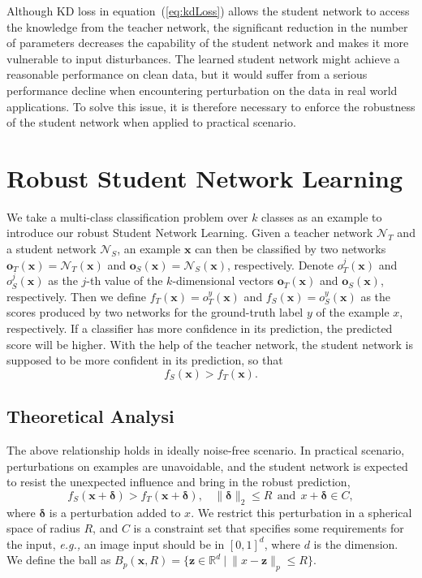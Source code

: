 \documentclass[journal]{IEEEtran}
\newcommand{\Eref}[1]{equation~(\ref{#1})}
\newcommand{\bx}{\bm{x}}
\newcommand{\bo}{\bm{o}}
\newcommand{\bz}{\bm{z}}
\newcommand{\bdelta}{\bm{\delta}}
\begin{document}
Although KD loss in \Eref{eq:kdLoss} allows the student network to access the knowledge from the teacher network, the significant reduction in the number of parameters decreases the capability of the student network and makes it more vulnerable to input disturbances. The learned student network might achieve a reasonable performance on clean data, but it would suffer from a serious performance decline when encountering perturbation on the data in real world applications. To solve this issue, it is therefore necessary to enforce the robustness of the student network when applied to practical scenario.

\section{Robust Student Network Learning} 
We take a multi-class classification problem over $k$ classes as an example to introduce our robust Student Network Learning. Given a teacher network $\mathcal N_T$ and a student network $\mathcal N_S$, an example $\bx$ can then be classified by two networks $\bo_T(\bx) = \mathcal N_T(\bx)$ and $\bo_S(\bx) = \mathcal N_S(\bx)$, respectively. Denote $o_T^j(\bx)$ and  $o_S^j(\bx)$ as the $j$-th value of the $k$-dimensional vectors $\bo_T(\bx)$ and $\bo_S(\bx)$, respectively. Then we define $f_T(\bx) = o_T^y(\bx)$ and $f_S(\bx) = o_S^y(\bx)$ as the scores produced by two networks for the ground-truth label $y$ of the example $x$, respectively. If a classifier has more confidence in its prediction, the predicted score will be higher. With the help of the teacher network, the student network is supposed to be more confident in its prediction, so that
\begin{equation}
f_S(\bx)>f_T(\bx).
\label{eq:constrain1}
\end{equation}

\subsection{Theoretical Analysi}
The above relationship holds in ideally noise-free scenario. In practical scenario, perturbations on examples are unavoidable, and the student network is expected to resist the unexpected influence and bring in the robust prediction,
\begin{equation}
f_S(\bx+\bdelta)>f_T(\bx+\bdelta), \ \ \ \ \|\bdelta\|_2 \leq R \ \ \text{and}\ \ x+\bdelta \in C,
\label{eq:what_is_robust}
\end{equation}
where $\bdelta$ is a perturbation added to $x$. We restrict this perturbation in a spherical space of radius $R$, and $C$ is a constraint set that specifies some requirements for the input, \emph{e.g.,} an image input should be in $[0,1]^d$, where $d$ is the dimension. We define the ball as $B_p(\bx,R) = \{\bz\in\mathbb R^d\ |\ \|x-\bz\|_p \leq R\}$.
\end{document}
